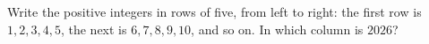 Write the positive integers in rows of five, from left to right: the first row is $1,2,3,4,5$, the next is $6,7,8,9,10$, and so on. In which column is $2026$?
